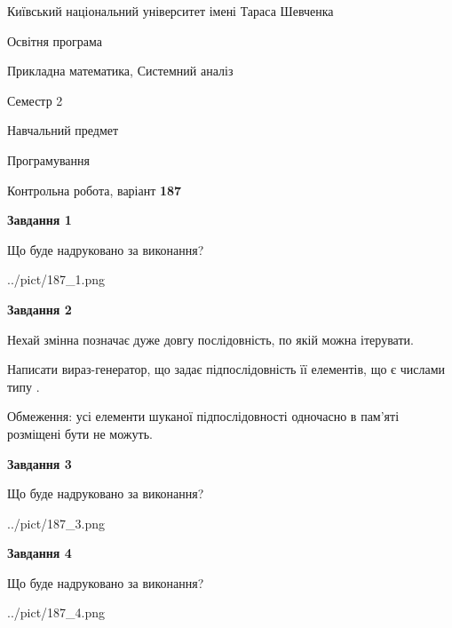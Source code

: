 \documentclass[12pt, ukrainian]{article}
\begin{document}
{{\begin {small}\par
{ \center  Київський національний університет імені Тараса Шевченка \par}
{\parbox {5 cm}{Освітня програма \hfill}{\parbox {8 cm}{Прикладна математика, Системний аналіз \hfill}}\parbox {5 cm}{\hfill Семестр 2}}\par
{\parbox {5 cm} {Навчальний предмет \hfill}\parbox {7 cm}{Програмування \hfill}\parbox {6cm}{\hfill}\par}\vspace{-7pt} \end{small}}{\center Контрольна робота, варіант  \No \textbf
{ 187 }\par}}
{
\begin {large}
{\begin {center}\textbf{Завдання 1}\end {center}}\par
Що буде надруковано за виконання?\par\par
\begin{center}
	{../pict/187_1.png}
\end{center}
\newpage

{\begin {center}\textbf{Завдання 2}\end {center}}\par
Нехай змінна  позначає дуже довгу послідовність, по якій можна ітерувати.

Написати вираз-генератор, що задає підпослідовність її елементів, що є числами типу .

Обмеження: усі елементи шуканої підпослідовності одночасно в пам'яті розміщені бути не можуть.\par
\newpage

{\begin {center}\textbf{Завдання 3}\end {center}}\par
Що буде надруковано за виконання?\par
\begin{center}
	{../pict/187_3.png}
\end{center}
\newpage

{\begin {center}\textbf{Завдання 4}\end {center}}\par
Що буде надруковано за виконання?\par
\begin{center}
	{../pict/187_4.png}
\end{center}
\newpage


\end{large}}
\end{document}
